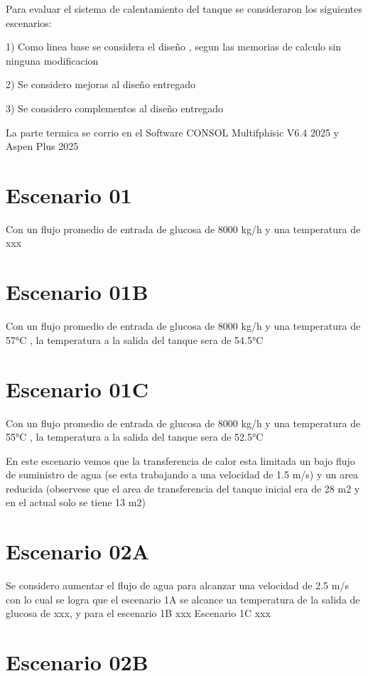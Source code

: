 \documentclass[11pt,a4paper]{article}
\begin{document}
Para evaluar el sistema de calentamiento del tanque se consideraron los siguientes escenarios:

1) Como linea base se considera el diseño , segun las memorias de calculo sin ninguna modificacion

2) Se considero mejoras al diseño entregado

3) Se considero complementos al diseño entregado 

La parte termica se corrio en el Software CONSOL Multifphisic V6.4 2025 y Aspen Plus 2025


\section{Escenario 01}

Con un flujo promedio de entrada de glucosa de 8000 kg/h y una temperatura de xxx


\section{Escenario 01B}

Con un flujo promedio de entrada de glucosa de 8000 kg/h y una temperatura de 57°C , la temperatura a la salida del tanque sera de 54.5°C

\section{Escenario 01C}

Con un flujo promedio de entrada de glucosa de 8000 kg/h y una temperatura de 55°C , la temperatura a la salida del tanque sera de 52.5°C


En este escenario vemos que la transferencia de calor esta limitada un bajo flujo de suministro de agua (se esta trabajando a una velocidad de 1.5 m/s) y un area reducida (observese que el area de transferencia del tanque inicial era de 28 m2 y en el actual solo se tiene 13 m2)


\section{Escenario 02A}

Se considero aumentar el flujo de agua para alcanzar una velocidad de 2.5 m/s con lo cual se logra que el escenario 1A se alcance ua temperatura de la salida de glucosa de xxx, y para el escenario 1B xxx
Escenario 1C xxx


\section{Escenario 02B}
\end{document}
